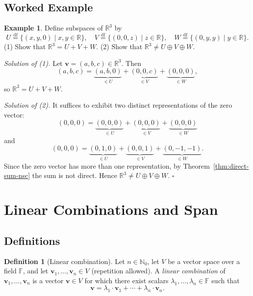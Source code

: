 \documentclass[11pt, a4paper, notitlepage]{report}
\theoremstyle{definition}
\newtheorem{definition}[theorem]{Definition}
\newtheorem{example}[theorem]{Example}
\theoremstyle{remark}
\begin{document}
\subsection{Worked Example}

\begin{example}\label{ex:direct-sum-r3}
Define subspaces of $\mathbb{R}^3$ by
\[
  U \stackrel{\mathrm{df}}{=} \{(x,y,0) \mid x,y \in \mathbb{R}\}, \quad
  V \stackrel{\mathrm{df}}{=} \{(0,0,z) \mid z \in \mathbb{R}\}, \quad
  W \stackrel{\mathrm{df}}{=} \{(0,y,y) \mid y \in \mathbb{R}\}.
\]
(1) Show that $\mathbb{R}^3 = U + V + W$. \quad (2) Show that $\mathbb{R}^3 \neq U \oplus V \oplus W$.

\emph{Solution of (1).} Let $\mathbf{v} = (a,b,c) \in \mathbb{R}^3$. Then
\[
  (a,b,c) = \underbrace{(a,b,0)}_{\in U} + \underbrace{(0,0,c)}_{\in V} + \underbrace{(0,0,0)}_{\in W},
\]
so $\mathbb{R}^3 = U + V + W$.

\emph{Solution of (2).} It suffices to exhibit two distinct representations of the zero vector:
\[
  (0,0,0) = \underbrace{(0,0,0)}_{\in U} + \underbrace{(0,0,0)}_{\in V} + \underbrace{(0,0,0)}_{\in W}
\]
and
\[
  (0,0,0) = \underbrace{(0,1,0)}_{\in U} + \underbrace{(0,0,1)}_{\in V} + \underbrace{(0,-1,-1)}_{\in W}.
\]
Since the zero vector has more than one representation, by Theorem~\ref{thm:direct-sum-nsc} the sum is not direct. Hence $\mathbb{R}^3 \neq U \oplus V \oplus W$. $\square$
\end{example}

\section{Linear Combinations and Span}
\label{sec:span}

\subsection{Definitions}

\begin{definition}[Linear combination]\label{def:linear-combination}
Let $n \in \mathbb{N}_0$, let $V$ be a vector space over a field $\mathbb{F}$, and let $\mathbf{v}_1, \ldots, \mathbf{v}_n \in V$ (repetition allowed). A \emph{linear combination} of $\mathbf{v}_1, \ldots, \mathbf{v}_n$ is a vector $\mathbf{v} \in V$ for which there exist scalars $\lambda_1, \ldots, \lambda_n \in \mathbb{F}$ such that
\[
  \mathbf{v} = \lambda_1 \cdot \mathbf{v}_1 + \cdots + \lambda_n \cdot \mathbf{v}_n.
\]
\end{definition}
\end{document}
